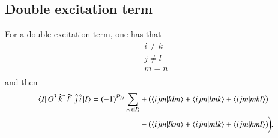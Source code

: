 \documentclass[aip,jcp,reprint,noshowkeys,superscriptaddress]{revtex4-1}
\newcommand{\overlap}[2]{\langle #1 | #2 \rangle}
\newcommand{\opr}[1]{\,\hat{#1}}
\newcommand{\oprd}[1]{\,\hat{#1}^\dagger}
\begin{document}
\subsection{Double excitation term}
For a double excitation term, one has that 
\begin{equation}
 \begin{aligned}
  i \ne k \\
  j \ne l \\
  m = n \\
 \end{aligned}
\end{equation}
and then 
\begin{equation}
 \begin{aligned}
 \bra{I}O^3 \oprd{k}\oprd{l} \opr{j} \opr{i} \ket{I} = (-1)^{\mathcal{P}_{IJ}}
 \sum_{m\in \ket{I}} 
 &+ \big( \overlap{ijm}{klm} + \overlap{ijm}{lmk}  + \overlap{ijm}{mkl} \big) \\
 &- \big( \overlap{ijm}{lkm} + \overlap{ijm}{mlk}  + \overlap{ijm}{kml} \big) \bigg).
 \end{aligned}
\end{equation}
\end{document}

